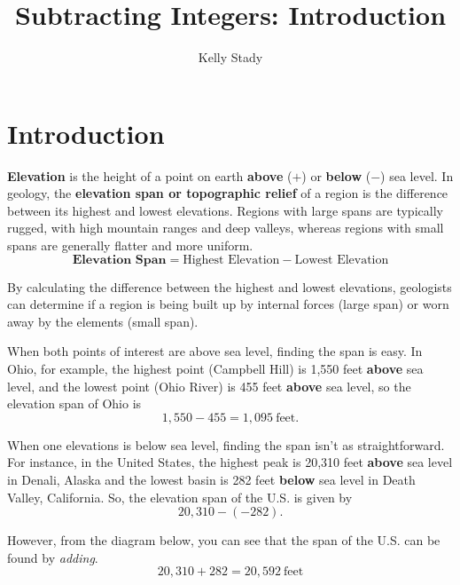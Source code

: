 \documentclass{ximera}[font=12pt]
\title{Subtracting Integers:  Introduction}   %
\author{Kelly Stady}
\begin{document}
\begin{abstract}

\end{abstract}

\maketitle
\label{xim:SubtractIntActivity}


\section*{Introduction}

\textbf{Elevation} is the height of a point on earth \textbf{above} ($+$) or \textbf{below} ($-$) sea level.  In geology, the \textbf{elevation span or topographic relief} of a region is the difference between its highest and lowest elevations. Regions with large spans are typically rugged, with high mountain ranges and deep valleys, whereas regions with small spans are generally flatter and more uniform.
\[ \textbf{Elevation Span} = \textrm{Highest Elevation} - \textrm{Lowest Elevation} \]

By calculating the difference between the highest and lowest elevations, geologists can determine if a region is being built up by internal forces (large span) or worn away by the elements (small span).

When both points of interest are above sea level, finding the span is easy.  In Ohio, for example, the highest point (Campbell Hill) is 1,550 feet \textbf{above} sea level, and the lowest point (Ohio River) is 455 feet \textbf{above} sea level, so the elevation span of Ohio is
\[ 1,550 - 455 = 1,095 \ \textrm{feet}. \]

When one elevations is below sea level, finding the span isn't as straightforward.  For instance, in the United States, the highest peak is 20,310 feet \textbf{above} sea level in Denali, Alaska and the lowest basin is 282 feet \textbf{below} sea level in Death Valley, California.  So, the elevation span of the U.S. is given by
\[ 20,310 - (-282). \]

However, from the diagram below, you can see that the span of the U.S. can be found by \emph{adding}.
\[ 20,310 + 282 = 20,592 \ \textrm{feet} \]
\end{document}
